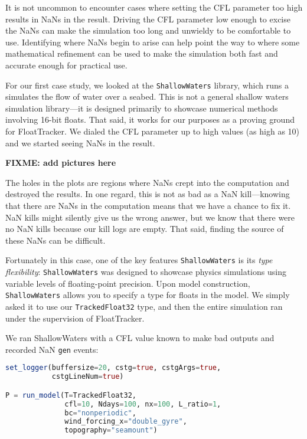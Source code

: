 \documentclass{juliacon}
\begin{document}
It is not uncommon to encounter cases where setting the CFL parameter too high results in NaNs in the result.
Driving the CFL parameter low enough to excise the NaNs can make the simulation too long and unwieldy to be comfortable to use.
Identifying where NaNs begin to arise can help point the way to where some mathematical refinement can be used to make the simulation both fast and accurate enough for practical use.

For our first case study, we looked at the \texttt{ShallowWaters} library,\cite{klowerNumberFormatsError2020,klowerPositsAlternativeFloats2019,klowerLowprecisionClimateComputing2021} which runs a simulates the flow of water over a seabed.
This is not a general shallow waters simulation library---it is designed primarily to showcase numerical methods involving 16-bit floats.
That said, it works for our purposes as a proving ground for FloatTracker.
We dialed the CFL parameter up to high values (as high as 10) and we started seeing NaNs in the result.

\textbf{FIXME: add pictures here}

The holes in the plots are regions where NaNs crept into the computation and destroyed the results.
In one regard, this is not as bad as a NaN kill---knowing that there are NaNs in the computation means that we have a chance to fix it.
NaN kills might silently give us the wrong answer, but we know that there were no NaN kills because our kill logs are empty.
That said, finding the source of these NaNs can be difficult.

Fortunately in this case, one of the key features \texttt{ShallowWaters} is its \emph{type flexibility}:
\texttt{ShallowWaters} was designed to showcase physics simulations using variable levels of floating-point precision.
Upon model construction, \texttt{ShallowWaters} allows you to specify a type for floats in the model.
We simply asked it to use our \texttt{TrackedFloat32} type, and then the entire simulation ran under the supervision of FloatTracker.

We ran ShallowWaters with a CFL value known to make bad outputs and recorded NaN \texttt{gen} events:

\begin{lstlisting}[language = Julia]
set_logger(buffersize=20, cstg=true, cstgArgs=true,
           cstgLineNum=true)

P = run_model(T=TrackedFloat32,
              cfl=10, Ndays=100, nx=100, L_ratio=1,
              bc="nonperiodic",
              wind_forcing_x="double_gyre",
              topography="seamount")
\end{lstlisting}
\end{document}

